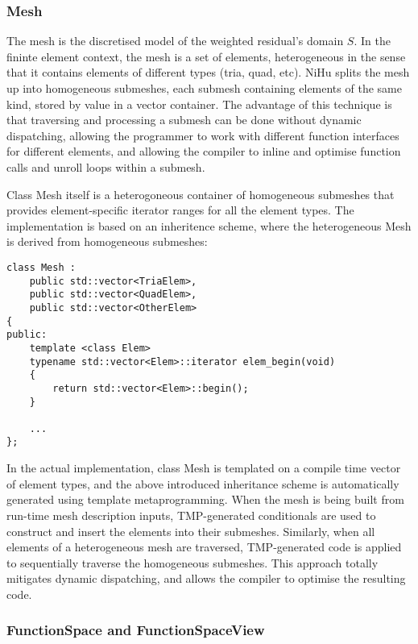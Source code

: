 \documentclass[review]{elsarticle}
\begin{document}
\subsubsection{Mesh}

The mesh is the discretised model of the weighted residual's domain $S$.
In the fininte element context, the mesh is a set of elements, heterogeneous in the sense that it contains elements of different types (tria, quad, etc).
NiHu splits the mesh up into homogeneous submeshes, each submesh containing elements of the same kind, stored by value in a vector container.
The advantage of this technique is that traversing and processing a submesh can be done without dynamic dispatching, allowing the programmer to work with different function interfaces for different elements, and allowing the compiler to inline and optimise function calls and unroll loops within a submesh.

Class Mesh itself is a heterogoneous container of homogeneous submeshes that provides element-specific iterator ranges for all the element types.
The implementation is based on an inheritence scheme, where the heterogeneous Mesh is derived from homogeneous submeshes:

\begin{verbatim}
class Mesh :
    public std::vector<TriaElem>,
    public std::vector<QuadElem>,
    public std::vector<OtherElem>
{
public:
    template <class Elem>	
    typename std::vector<Elem>::iterator elem_begin(void)
    {
        return std::vector<Elem>::begin();
    }
    
    ...
};
\end{verbatim}

In the actual implementation, class Mesh is templated on a compile time vector of element types, and the above introduced inheritance scheme is automatically generated using template metaprogramming.
When the mesh is being built from run-time mesh description inputs, TMP-generated conditionals are used to construct and insert the elements into their submeshes.
Similarly, when all elements of a heterogeneous mesh are traversed, TMP-generated code is applied to sequentially traverse the homogeneous submeshes.
This approach totally mitigates dynamic dispatching, and allows the compiler to optimise the resulting code.


\subsubsection{FunctionSpace and FunctionSpaceView}
\end{document}
